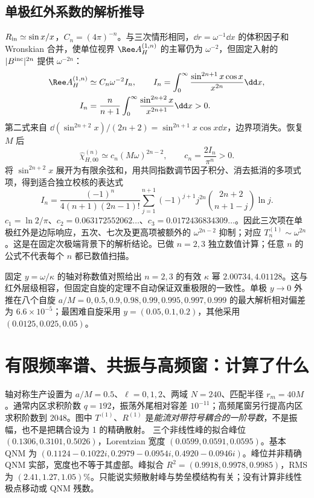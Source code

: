 \subsection{单极红外系数的解析推导}
$R_{\rm in}\simeq\sin x/x$，$C_n=(4\pi)^{-n}$。与三次情形相同，$\dd r=\omega^{-1}\dd x$ 的体积因子和 Wronskian 合并，使单位视界 $\Ree A_H^{(1,n)}$ 的主幂仍为 $\omega^{-2}$，但固定入射的 $|B^{\rm inc}|^{2n}$ 提供 $\omega^{-2n}$：
\begin{align}
 \Ree A_H^{(1,n)}&\simeq C_n\omega^{-2}I_n,\qquad
 I_n=\int_0^\infty\frac{\sin^{2n+1}x\cos x}{x^{2n}}\dd x,\\
 I_n&=\frac{n}{n+1}\int_0^\infty
 \frac{\sin^{2n+2}x}{x^{2n+1}}\dd x>0.
\end{align}
第二式来自 $\dd(\sin^{2n+2}x)/(2n+2)=\sin^{2n+1}x\cos x\dd x$，边界项消失。恢复 $M$ 后
\begin{equation}
 \boxed{\widehat\chi_{H,00}^{(n)}\simeq c_n(M\omega)^{2n-2},
 \qquad c_n=\frac{2I_n}{\pi^n}>0.}
\label{eq:new-alln}
\end{equation}
将 $\sin^{2n+2}x$ 展开为有限余弦和，用共同指数调节因子积分、消去抵消的多项式项，得到适合独立校核的表达式
\begin{equation}
 I_n=\frac{(-1)^n}{4(n+1)(2n-1)!}
 \sum_{j=1}^{n+1}(-1)^{j+1}j^{2n}
 \binom{2n+2}{n+1-j}\ln j.
\end{equation}
$c_1=\ln2/\pi$、$c_2=0.063172552062\ldots$、$c_3=0.0172436834309\ldots$。因此三次项在单极红外是边际响应，五次、七次及更高项被额外的 $\omega^{2n-2}$ 抑制；对应 $T_n^{(1)}\sim\omega^{2n}$。这是在固定次极端背景下的解析结论。已做 $n=2,3$ 独立数值计算；任意 $n$ 的公式不代表每个 $n$ 都已数值扫描。

固定 $y=\omega/\kappa$ 的轴对称数值对照给出 $n=2,3$ 的有效 $\kappa$ 幂 $2.00734,4.01128$。这与红外层级相容，但固定自旋的定理不自动保证双重极限的一致性。单极 $y\to0$ 外推在八个自旋 $a/M=0,0.5,0.9,0.98,0.99,0.995,0.997,0.999$ 的最大解析相对偏差为 $6.6\times10^{-5}$；最困难自旋采用 $y=(0.05,0.1,0.2)$，其他采用 $(0.0125,0.025,0.05)$。

\section{有限频率谱、共振与高频窗：计算了什么}
轴对称生产设置为 $a/M=0.5$、$\ell=0,1,2$、两域 $N=240$、匹配半径 $r_m=40M$。通常内区求积阶数 $q=192$，振荡外尾相对容差 $10^{-11}$；高频尾窗另行提高内区求积阶数到 $2048$。图中 $T^{(1)}$、$R^{(1)}$ 是\emph{能流对带符号耦合的一阶导数}，不是振幅，也不是把耦合设为 1 的精确散射。
三个非线性峰的拟合峰位 $(0.1306,0.3101,0.5026)$，Lorentzian 宽度 $(0.0599,0.0591,0.0595)$。基本 QNM 为 $(0.1124-0.1022i,0.2979-0.0954i,0.4920-0.0946i)$。峰位并非精确 QNM 实部，宽度也不等于其虚部。峰拟合 $R^2=(0.9918,0.9978,0.9985)$，RMS 为 $(2.41,1.27,1.05)\%$。只能说实频散射峰与势垒模结构有关；没有计算非线性极点移动或 QNM 残数。

